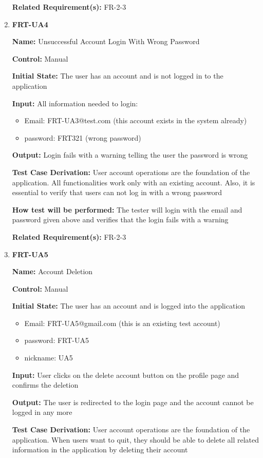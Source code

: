 \documentclass[12pt, titlepage]{article}
\begin{document}
\begin{enumerate}
\textbf{Related Requirement(s):} FR-2-3

\item{\textbf{FRT-UA4}}

\textbf{Name:} Unsuccessful Account Login With Wrong Password

\textbf{Control:} Manual
					
\textbf{Initial State:} The user has an account and is not logged in to the application

\textbf{Input:} All information needed to login:
\begin{itemize}
\item Email: FRT-UA3@test.com (this account exists in the system already)
\item password: FRT321 (wrong password)
\end{itemize}
					
\textbf{Output:} Login fails with a warning telling the user the password is wrong

\textbf{Test Case Derivation:} User account operations are the foundation of the application. All functionalities work only with an existing account. Also, it is essential to verify that users can not log in with a wrong password
					
\textbf{How test will be performed:} The tester will login with the email and password given above and verifies that the login fails with a warning

\textbf{Related Requirement(s):} FR-2-3

\item{\textbf{FRT-UA5}}

\textbf{Name:} Account Deletion

\textbf{Control:} Manual
					
\textbf{Initial State:} The user has an account and is logged into the application
\begin{itemize}
\item Email: FRT-UA5@gmail.com (this is an existing test account)
\item password: FRT-UA5
\item nickname: UA5
\end{itemize}

\textbf{Input:} User clicks on the delete account button on the profile page and confirms the deletion
					
\textbf{Output:} The user is redirected to the login page and the account cannot be logged in any more

\textbf{Test Case Derivation:} User account operations are the foundation of the application. When users want to quit, they should be able to delete all related information in the application by deleting their account
					

\end{enumerate}
\end{document}
